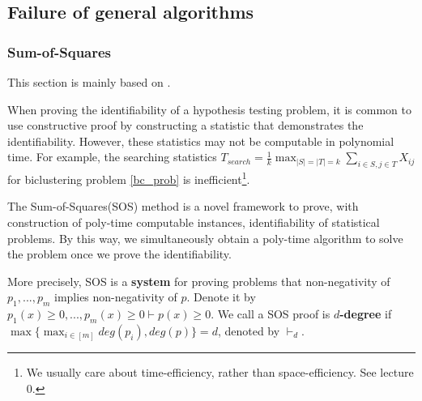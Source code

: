 \subsection{Failure of general algorithms}

\subsubsection{Sum-of-Squares}
This section is mainly based on \cite{sos_1}\cite{sos_2}\cite{sos_schramm}.

When proving the identifiability of a hypothesis testing problem, it is common to use constructive proof by constructing a statistic that demonstrates the identifiability. However, these statistics may not be computable in polynomial time.
For example, the searching statistics $T_{search}=\frac{1}{k}\max_{|S|=|T|=k}\sum_{i\in S,j\in T}X_{ij}$ for biclustering problem \ref{bc_prob} is inefficient\footnote{We usually care about time-efficiency, rather than space-efficiency. See \cite{sos_schramm} lecture 0.}.

The Sum-of-Squares(SOS) method is a novel framework to prove, with construction of poly-time computable instances, identifiability of statistical problems.
By this way, we simultaneously obtain a poly-time algorithm to solve the problem once we prove the identifiability.

More precisely, SOS is a \textbf{system} for proving problems that non-negativity of $p_1,...,p_m$ implies non-negativity of $p$. Denote it by $p_1(x)\ge 0,...,p_m(x)\ge 0\vdash p(x)\ge 0$. We call a SOS proof is \textbf{$d$-degree} if $\max\{\max_{i\in[m]} deg(p_i),deg(p)\}=d$, denoted by $\vdash_d$.


